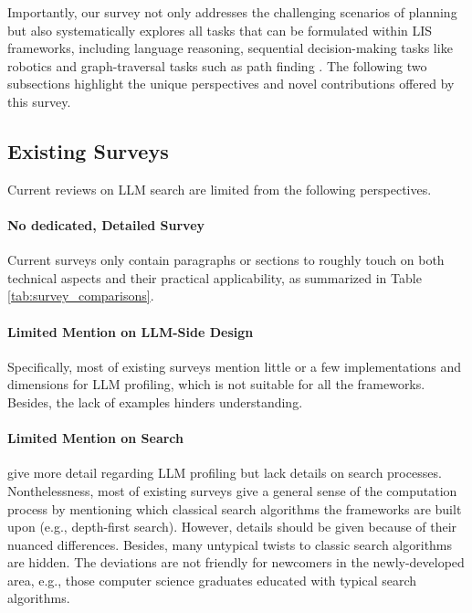 Importantly, our survey not only addresses the challenging scenarios of planning but also systematically explores all tasks that can be formulated within LIS frameworks, including language reasoning, sequential decision-making tasks like robotics \citep{Putta2024AgentQA} and graph-traversal tasks such as path finding \citep{meng2024llm}. The following two subsections highlight the unique perspectives and novel contributions offered by this survey.


\subsection{Existing Surveys}
Current reviews on LLM search are limited from the following perspectives.
\paragraph{No dedicated, Detailed Survey}
Current surveys only contain paragraphs or sections to roughly touch on both technical aspects and their practical applicability, as summarized in Table \ref{tab:survey_comparisons}. 

\paragraph{Limited Mention on LLM-Side Design} Specifically, most of existing surveys \citep{huang2024understanding,wang2024survey} mention little or a few implementations and dimensions for LLM profiling, which is not suitable for all the frameworks. Besides, the lack of examples hinders understanding. 

\paragraph{Limited Mention on Search}
\citet{li2024survey} give more detail regarding LLM profiling but lack details on search processes. Nonthelessness, most of existing surveys \citep{huang2024understanding,wang2024survey} give a general sense of the computation process by mentioning which classical search algorithms the frameworks are built upon (e.g., depth-first search). However, details should be given because of their nuanced differences. Besides, many untypical twists to classic search algorithms are hidden. The deviations are not friendly for newcomers in the newly-developed area, e.g., those computer science graduates educated with typical search algorithms. 




